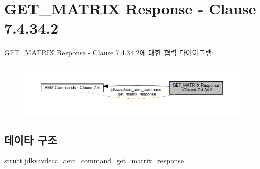 \hypertarget{group__command__get__matrix__response}{}\section{G\+E\+T\+\_\+\+M\+A\+T\+R\+IX Response -\/ Clause 7.4.34.2}
\label{group__command__get__matrix__response}
G\+E\+T\+\_\+\+M\+A\+T\+R\+IX Response -\/ Clause 7.4.34.2에 대한 협력 다이어그램\+:
\nopagebreak
\begin{figure}[H]
\begin{center}
\leavevmode
\includegraphics[width=350pt]{group__command__get__matrix__response}
\end{center}
\end{figure}
\subsection*{데이타 구조}
\begin{DoxyCompactItemize}
\item 
struct \hyperlink{structjdksavdecc__aem__command__get__matrix__response}{jdksavdecc\+\_\+aem\+\_\+command\+\_\+get\+\_\+matrix\+\_\+response}
\end{DoxyCompactItemize}
